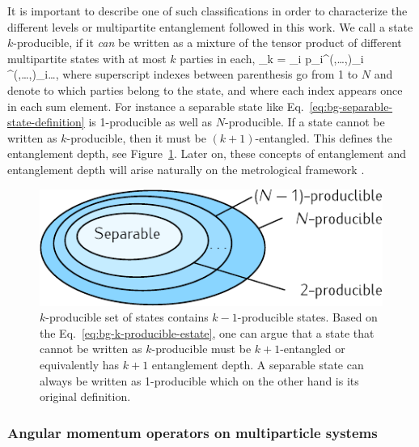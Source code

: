 It is important to describe one of such classifications in order to characterize the different levels or multipartite entanglement followed in this work.
We call a state $k$-producible, if it \emph{can} be written as a mixture of the tensor product of different multipartite states with at most $k$ parties in each,
\be
  \label{eq:bg-k-producible-estate}
  \rho_{k} = \sum_i p_i\rho^{(\alpha,\dots,\beta)}_i \otimes \rho^{(\gamma,\dots,\delta)}_i\otimes \dots,
\ee
where superscript indexes between parenthesis go from 1 to $N$ and denote to which parties belong to the state, and where each index appears once in each sum element.
For instance a separable state like Eq.~\eqref{eq:bg-separable-state-definition} is 1-producible as well as $N$-producible.
If a state cannot be written as $k$-producible, then it must be $(k+1)$-entangled.
This defines the entanglement depth, see Figure~\ref{fig:bg-separability-k-producibility-circle}.
Later on, these concepts of entanglement and entanglement depth will arise naturally on the metrological framework \cite{Toth2014}.
\begin{figure}[htp]
  \centering
  \includegraphics[scale=1.2]{img/BG_separability_k_producibility_circle.pdf}
  \caption[Diagram for $k$-producibility sets]{
  $k$-producible set of states contains $k-1$-producible states. Based on the Eq.~\eqref{eq:bg-k-producible-estate}, one can argue that a state that cannot be written as $k$-producible must be $k+1$-entangled or equivalently has $k+1$ entanglement depth. A separable state can always be written as 1-producible which on the other hand is its original definition.}
  \label{fig:bg-separability-k-producibility-circle}
\end{figure}

\subsubsection{Angular momentum operators on multiparticle systems}
\label{sec:bg-angular-momentum-operators}

